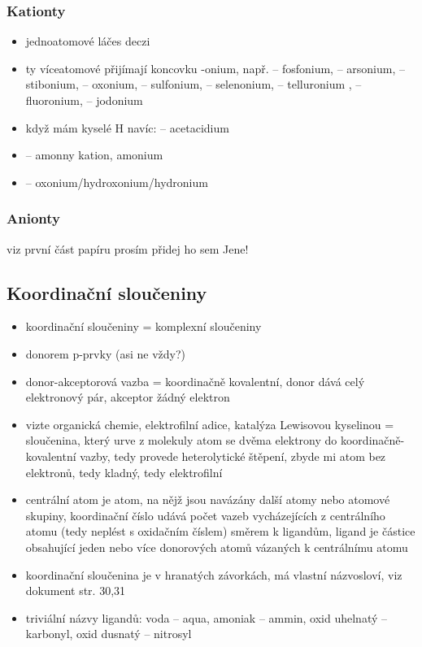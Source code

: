 \documentclass{article}
\begin{document}
\subsubsection{Kationty}
\begin{itemize}
  \item jednoatomové láčes deczi
  \item ty víceatomové přijímají koncovku -onium, např.  -- fosfonium,  -- arsonium,  -- stibonium,  -- oxonium,  -- sulfonium,  -- selenonium,  -- telluronium ,  -- fluoronium,  -- jodonium
  \item když mám kyselé H navíc:  -- acetacidium
  \item {} -- amonny kation, amonium
  \item {} -- oxonium/hydroxonium/hydronium
\end{itemize}

\subsubsection{Anionty}
viz první část papíru prosím přidej ho sem Jene!

\subsection{Koordinační sloučeniny}
\begin{itemize}
  \item koordinační sloučeniny = komplexní sloučeniny
  \item donorem p-prvky (asi ne vždy?)
  \item donor-akceptorová vazba = koordinačně kovalentní, donor dává celý elektronový pár, akceptor žádný elektron
  \item vizte organická chemie, elektrofilní adice, katalýza Lewisovou kyselinou = sloučenina, který urve z molekuly atom se dvěma elektrony do koordinačně-kovalentní vazby, tedy provede heterolytické štěpení, zbyde mi atom bez elektronů, tedy kladný, tedy elektrofilní
  \item centrální atom je atom, na nějž jsou navázány další atomy nebo atomové skupiny, koordinační číslo udává počet vazeb vycházejících z centrálního atomu (tedy neplést s oxidačním číslem) směrem k ligandům, ligand je částice obsahující jeden nebo více donorových atomů vázaných k centrálnímu atomu
  \item koordinační sloučenina je v hranatých závorkách, má vlastní názvosloví, viz dokument str. 30,31
  \item triviální názvy ligandů: voda -- aqua, amoniak -- ammin, oxid uhelnatý -- karbonyl, oxid dusnatý -- nitrosyl
\end{itemize}
\end{document}

